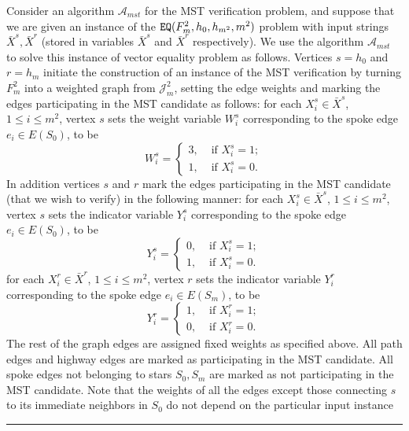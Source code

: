 \documentclass[11pt,letter]{article}
\def\EQ{\mbox{\tt EQ}}
\def\cA{\mathcal{A}}
\def\cJ{\mathcal{J}}
\def\INPUT{\bar{X}^s,\bar{X}^r}
\def\indVarS{\bar{X}^s}
\def\indVarR{\bar{X}^r}
\newcommand{\qed}{\rule{7pt}{7pt}}
\newenvironment{proof}{\noindent{\bf Proof}\hspace*{1em}}{\qed\bigskip}
\begin{document}
\begin{proof}
Consider an algorithm $\cA_{mst}$ for the MST verification problem, and 
suppose that we are given an instance of the $\EQ(F_m^2,h_0,h_{m^2},m^2)$
problem with input strings $\INPUT$ (stored in variables 
$\indVarS$ and $\indVarR$ respectively). We use the algorithm $\cA_{mst}$
to solve this instance of vector equality problem as follows.
Vertices $s=h_0$ and $r=h_m$ initiate the construction of an
instance of the MST verification by turning $F_m^2$ into a weighted graph from
$\cJ_m^2$, setting the edge weights and marking the edges participating in 
the MST candidate as follows:
for each $X_i^s \in \indVarS$, $1 \le i \le m^2$, vertex $s$ sets the weight
variable $W_i^{s}$ corresponding to the spoke edge $e_i \in
E(S_0)$,
to be
\begin{displaymath}
W_i^{s} =
\begin{cases}
3, &\text { if }  X_i^s = 1; \\ 
1, &\text { if }  X_i^s = 0.
\end{cases}
\end{displaymath}
In addition vertices $s$ and $r$ mark the edges participating in the MST 
candidate (that we wish to verify) in the following manner:  
for each $X_i^s \in \indVarS$, $1 \le i \le m^2$, vertex $s$ sets 
the indicator variable $Y_i^{s}$ corresponding to the spoke edge 
$e_i \in E(S_0)$,
to be
\begin{displaymath}
Y^s_i =
\begin{cases}
0, &\text { if }  X_i^s = 1; \\
1, &\text { if }  X_i^s = 0.
\end{cases}
\end{displaymath}
for each $X_i^r \in \indVarR$, $1 \le i \le m^2$, vertex $r$ sets 
the indicator variable $Y_i^{r}$ corresponding to the spoke edge 
$e_i \in E(S_m)$,
to be
\begin{displaymath}
Y^r_i =
\begin{cases}
1, &\text { if }  X_i^r = 1; \\
0, &\text { if }  X_i^r = 0.
\end{cases}
\end{displaymath}
The rest of the graph edges are assigned fixed weights as specified above.
All path edges and highway edges are marked 
as participating in the MST candidate. All spoke edges not belonging to stars 
$S_0, S_m$ are marked as not participating in the MST candidate.  
Note that the weights of all the edges except those connecting $s$ to its 
immediate neighbors in $S_0$ do not depend on the particular input instance 

\end{proof}
\end{document}
